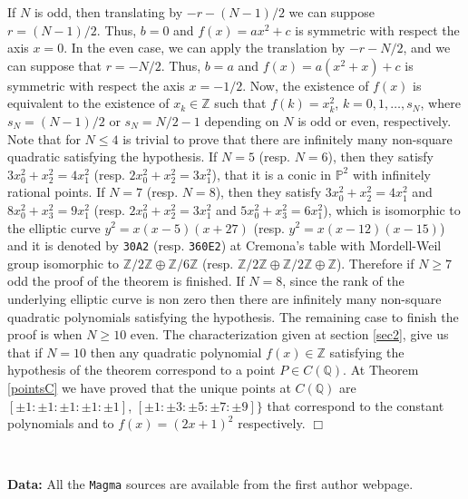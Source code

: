 \documentclass[a4paper,12pt]{amsart}
\theoremstyle{remark}
\theoremstyle{definition}
\newenvironment{pfm}{\par\noindent{\bf Proof of Theorem \ref{Mthm}.}\enspace\ignorespaces}{{\hfill $\Box$}\par\par}
\begin{document}
\begin{pfm}
If $N$ is odd, then translating by $-r-(N-1)/2$ we can suppose
$r=(N-1)/2$. Thus, $b=0$ and $f(x)=ax^2+c$ is symmetric with
respect the axis $x=0$. In the even case, we can apply the
translation by $-r-N/2$, and we can suppose that $r=-N/2$. Thus,
$b=a$ and $f(x)=a(x^2+x)+c$ is symmetric with respect the axis
$x=-1/2$. Now, the existence of $f(x)$ is equivalent to the
existence of $x_k\in {{\mathbb{Z}}}$ such that $f(k)=x_k^2$,
$k=0,1,\dots,s_N$, where $s_N=(N-1)/2$ or $s_N=N/2-1$ depending on
$N$ is odd or even, respectively. Note that for $N\le 4$ is
trivial to prove that there are infinitely many non-square
quadratic satisfying the hypothesis. If $N=5$ (resp. $N=6$), then
they satisfy $3x_0^2+x_2^2=4x_1^2$ (resp. $2x_0^2+x_2^2=3x_1^2$),
that it is a conic in ${{\mathbb{P}}}^2$ with infinitely rational points. If
$N=7$ (resp. $N=8$), then they satisfy $3x_0^2+x_2^2=4x_1^2$ and
$8x_0^2+x_3^2=9x_1^2$ (resp. $2x_0^2+x_2^2=3x_1^2$ and
$5x_0^2+x_3^2=6x_1^2$), which is isomorphic to the elliptic curve
$y^2=x(x-5)(x+27)$ (resp. $y^2=x(x-12)(x-15)$) and it is denoted
by \verb+30A2+ (resp. \verb+360E2+) at Cremona's table with
Mordell-Weil group isomorphic to ${{\mathbb{Z}}}/2{{\mathbb{Z}}}\oplus{{\mathbb{Z}}}/6{{\mathbb{Z}}}$ (resp.
${{\mathbb{Z}}}/2{{\mathbb{Z}}}\oplus{{\mathbb{Z}}}/2{{\mathbb{Z}}}\oplus {{\mathbb{Z}}}$). Therefore if $N\ge 7$ odd the
proof of the theorem is finished. If $N=8$, since the rank of the
underlying elliptic curve is non zero then there are infinitely
many non-square quadratic polynomials satisfying the hypothesis. The remaining
case to finish the proof is when $N\ge 10$ even. The
characterization given at section \ref{sec2}, give us that if
$N=10$ then any quadratic polynomial $f(x)\in{{\mathbb{Z}}}$ satisfying the
hypothesis of the theorem correspond to a point $P\in C({{\mathbb{Q}}})$. At
Theorem \ref{pointsC} we have proved that the unique points at
$C({{\mathbb{Q}}})$ are $[\pm1:\pm1:\pm1:\pm1:\pm1]$,
$[\pm1:\pm3:\pm5:\pm7:\pm9]\}$ that correspond to the constant
polynomials and to $f(x)=(2x+1)^2$ respectively.
\end{pfm}

\

{\bf Data:} All the \verb+Magma+ sources are available from the first author webpage.

\
\end{document}
